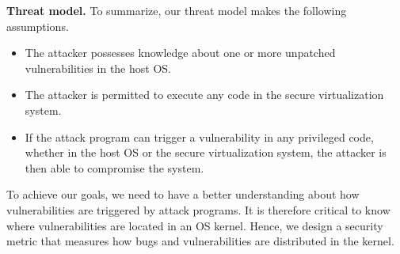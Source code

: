\noindent\textbf{Threat model.}
To summarize, our threat model makes the following assumptions.

\begin{itemize}\setlength\itemsep{0em}

\item The attacker possesses knowledge about one or more unpatched vulnerabilities in the host OS.

\item The attacker is permitted to execute any code in the secure virtualization system.

\item If the attack program can trigger a vulnerability in any privileged code,
whether in the host OS or the secure virtualization system, the attacker is then able to 
compromise the system.

\end{itemize}

To achieve our goals, we need to have a better understanding about how vulnerabilities are
triggered by attack programs. It is therefore critical to know where vulnerabilities are located in 
an OS kernel. Hence, we design a security metric that measures how bugs and vulnerabilities
are distributed in the kernel. 

